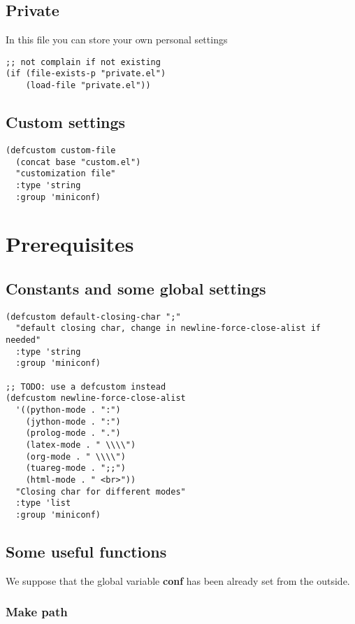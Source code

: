\documentclass[11pt]{article}
\begin{document}
\subsection{Private}
\label{sec-17.1}

   In this file you can store your own personal settings

\begin{verbatim}
;; not complain if not existing
(if (file-exists-p "private.el")
    (load-file "private.el"))
\end{verbatim}
\subsection{Custom settings}
\label{sec-17.2}

\begin{verbatim}
(defcustom custom-file
  (concat base "custom.el")
  "customization file"
  :type 'string
  :group 'miniconf)
\end{verbatim}
\section{Prerequisites}
\label{sec-18}
\subsection{Constants and some global settings}
\label{sec-18.1}

\begin{verbatim}
(defcustom default-closing-char ";"
  "default closing char, change in newline-force-close-alist if needed"
  :type 'string
  :group 'miniconf)

;; TODO: use a defcustom instead
(defcustom newline-force-close-alist
  '((python-mode . ":")
    (jython-mode . ":")
    (prolog-mode . ".")
    (latex-mode . " \\\\")
    (org-mode . " \\\\")
    (tuareg-mode . ";;")
    (html-mode . " <br>"))
  "Closing char for different modes"
  :type 'list
  :group 'miniconf)
\end{verbatim}
\subsection{Some useful functions}
\label{sec-18.2}

   We suppose that the global variable \textbf{conf} has been already set from the outside.
\subsubsection{Make path}
\label{sec-18.2.1}
\end{document}
